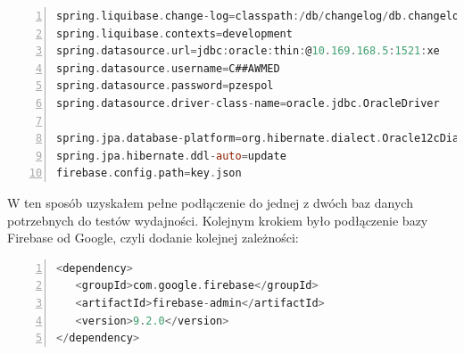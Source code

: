\begin{lstlisting}[language=C, mathescape, frame=single, numbers=left, xleftmargin=2em, framexleftmargin=2em, basicstyle=\ttfamily\bfseries, caption={Konfiguracja application.properties}, label={Konfiguracja application.properties}]
spring.liquibase.change-log=classpath:/db/changelog/db.changelog-master.xml
spring.liquibase.contexts=development
spring.datasource.url=jdbc:oracle:thin:@10.169.168.5:1521:xe
spring.datasource.username=C##AWMED
spring.datasource.password=pzespol
spring.datasource.driver-class-name=oracle.jdbc.OracleDriver

spring.jpa.database-platform=org.hibernate.dialect.Oracle12cDialect
spring.jpa.hibernate.ddl-auto=update
firebase.config.path=key.json
\end{lstlisting}

W ten sposób uzyskałem pełne podłączenie do jednej z dwóch baz danych potrzebnych do testów wydajności. Kolejnym krokiem było podłączenie bazy Firebase od Google, czyli dodanie kolejnej zależności:

\begin{lstlisting}[language=C, mathescape, frame=single, numbers=left, xleftmargin=2em, framexleftmargin=2em, basicstyle=\ttfamily\bfseries, caption={Zależnosci dla Firebase}, label={Zależnosci dla Firebase}]
<dependency>
   <groupId>com.google.firebase</groupId>
   <artifactId>firebase-admin</artifactId>
   <version>9.2.0</version>
</dependency>
\end{lstlisting}

